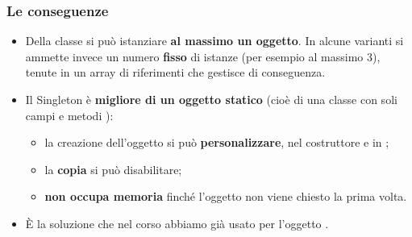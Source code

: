 
\subsubsection*{Le conseguenze}

\begin{itemize}
  \item Della classe si può istanziare \textbf{al massimo un oggetto}. In alcune varianti si ammette invece un numero
        \textbf{fisso} di istanze (per esempio al massimo 3), tenute in un array di riferimenti che 
        gestisce di conseguenza.
  \item Il Singleton è \textbf{migliore di un oggetto statico} (cioè di una classe con soli campi e metodi ):
        \begin{itemize}
          \item la creazione dell'oggetto si può \textbf{personalizzare}, nel costruttore e in ;
          \item la \textbf{copia} si può disabilitare;
          \item \textbf{non occupa memoria} finché l'oggetto non viene chiesto la prima volta.
        \end{itemize}
  \item È la soluzione che nel corso abbiamo già usato per l'oggetto .
\end{itemize}

